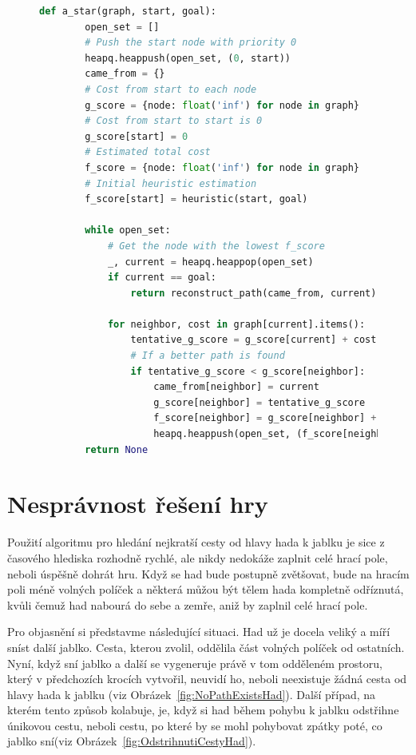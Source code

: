 \begin{figure}[H]
    \centering
    \begin{lstlisting}[language=python, style=python, caption={Implementace \(A^*\) v pythonu}, label={lst:a_star}, mathescape=true]
    def a_star(graph, start, goal):
        open_set = []
        # Push the start node with priority 0
        heapq.heappush(open_set, (0, start))
        came_from = {}
        # Cost from start to each node
        g_score = {node: float('inf') for node in graph}
        # Cost from start to start is 0
        g_score[start] = 0
        # Estimated total cost
        f_score = {node: float('inf') for node in graph}
        # Initial heuristic estimation
        f_score[start] = heuristic(start, goal)
    
        while open_set:
            # Get the node with the lowest f_score
            _, current = heapq.heappop(open_set)
            if current == goal:
                return reconstruct_path(came_from, current)
    
            for neighbor, cost in graph[current].items():
                tentative_g_score = g_score[current] + cost
                # If a better path is found
                if tentative_g_score < g_score[neighbor]:
                    came_from[neighbor] = current
                    g_score[neighbor] = tentative_g_score
                    f_score[neighbor] = g_score[neighbor] + heuristic(neighbor, goal)
                    heapq.heappush(open_set, (f_score[neighbor], neighbor))
        return None
    \end{lstlisting}
\end{figure}

\section{Nesprávnost řešení hry}

Použití algoritmu pro hledání nejkratší cesty od hlavy hada k jablku je sice z časového hlediska rozhodně rychlé, ale nikdy nedokáže zaplnit celé hrací pole, neboli úspěšně dohrát hru. Když se had bude postupně zvětšovat, bude na hracím poli méně volných políček a některá můžou být tělem hada kompletně odříznutá, kvůli čemuž had nabourá do sebe a zemře, aniž by zaplnil celé hrací pole. 

Pro objasnění si představme následující situaci. Had už je docela veliký a míří sníst další jablko. Cesta, kterou zvolil, oddělila část volných políček od ostatních. Nyní, když sní jablko a další se vygeneruje právě v tom odděleném prostoru, který v předchozích krocích vytvořil, neuvidí ho, neboli neexistuje žádná cesta od hlavy hada k jablku (viz Obrázek~\ref{fig:NoPathExistsHad}). Další případ, na kterém tento způsob kolabuje, je, když si had během pohybu k jablku odstřihne únikovou cestu, neboli cestu, po které by se mohl pohybovat zpátky poté, co jablko sní(viz Obrázek~\ref{fig:OdstrihnutiCestyHad}).


